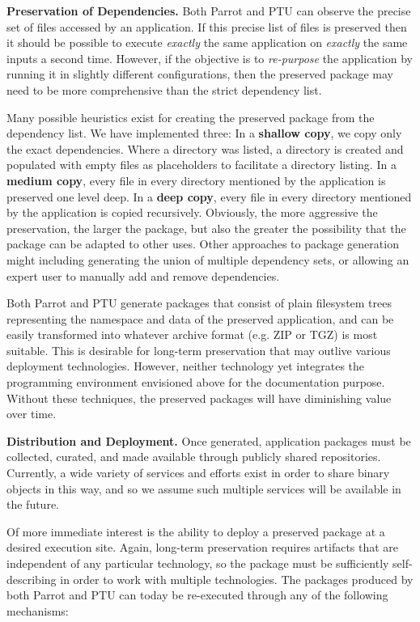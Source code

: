 {\bf Preservation of Dependencies.}  Both Parrot and PTU can observe the precise
set of files accessed by an application.  If this precise list of files is preserved
then it should be possible to execute
\emph{exactly} the same application on \emph{exactly} the same inputs a second
time.  However, if the objective is to \emph{re-purpose} the application by running it in slightly different configurations, then the preserved package may need to
be more comprehensive than the strict dependency list.

Many possible heuristics exist for creating the preserved package
from the dependency list.  We have implemented three:
In a {\bf shallow copy}, we copy only
the exact dependencies.  Where a directory was listed, a directory is created and populated with empty files as placeholders to facilitate a directory listing.  In a {\bf medium copy}, every file in every directory mentioned by the application is preserved one level deep.  In a {\bf deep copy}, every file in every directory mentioned by the application is copied recursively.  Obviously, the more aggressive the preservation, the larger the package, but also the greater the possibility that the package can be adapted to other uses.  Other approaches to package generation might including generating the union
of multiple dependency sets, or allowing an expert user to manually add
and remove dependencies.

Both Parrot and PTU generate packages that consist of plain filesystem trees representing the namespace and data of the preserved application, and can be easily transformed into whatever archive format (e.g. ZIP or TGZ) is most suitable.  This is desirable for long-term preservation that may outlive various deployment technologies.
However, neither technology yet integrates the programming environment envisioned above for the documentation purpose.  Without these techniques, the preserved packages will have diminishing value over time.

{\bf Distribution and Deployment.} Once generated, application packages must be collected, curated, and made
available through publicly shared repositories.  Currently, a 
wide variety of services and efforts exist in order to share binary objects in this way,
and so we assume such multiple services will be available in the future.

Of more immediate interest is the ability to deploy a preserved
package at a desired execution site.  Again, long-term preservation
requires artifacts that are independent of any particular technology,
so the package must be sufficiently self-describing in order
to work with multiple technologies.  The packages produced by both Parrot and PTU
can today be re-executed through any of the following mechanisms:

